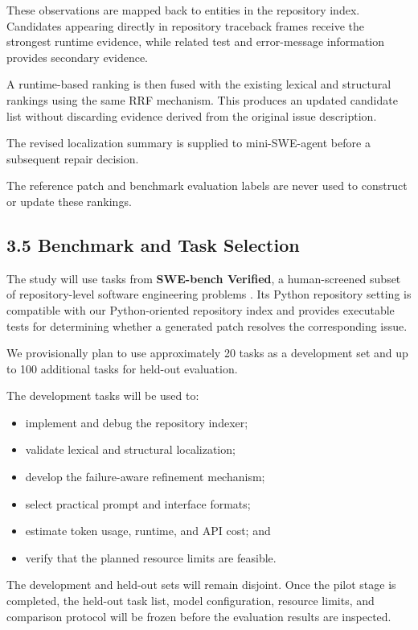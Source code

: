 \documentclass[11pt]{article}
\begin{document}
These observations are mapped back to entities in the repository index.
Candidates appearing directly in repository traceback frames receive the
strongest runtime evidence, while related test and error-message
information provides secondary evidence.

A runtime-based ranking is then fused with the existing lexical and
structural rankings using the same RRF mechanism. This produces an updated
candidate list without discarding evidence derived from the original issue
description.

The revised localization summary is supplied to mini-SWE-agent before a
subsequent repair decision.

The reference patch and benchmark evaluation labels are never used to
construct or update these rankings.


\subsection*{3.5 Benchmark and Task Selection}

The study will use tasks from \textbf{SWE-bench Verified}, a human-screened
subset of repository-level software engineering problems
\cite{openai2024verified}. Its Python repository setting is compatible
with our Python-oriented repository index and provides executable tests
for determining whether a generated patch resolves the corresponding
issue.

We provisionally plan to use approximately 20 tasks as a development set
and up to 100 additional tasks for held-out evaluation.

The development tasks will be used to:

\begin{itemize}[leftmargin=*, itemsep=0.25em]
    \item implement and debug the repository indexer;
    \item validate lexical and structural localization;
    \item develop the failure-aware refinement mechanism;
    \item select practical prompt and interface formats;
    \item estimate token usage, runtime, and API cost; and
    \item verify that the planned resource limits are feasible.
\end{itemize}

The development and held-out sets will remain disjoint. Once the pilot
stage is completed, the held-out task list, model configuration, resource
limits, and comparison protocol will be frozen before the evaluation
results are inspected.
\end{document}
